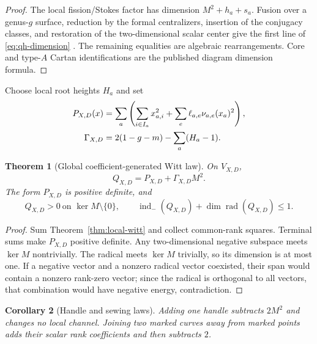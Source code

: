 \documentclass[11pt,a4paper]{amsart}
\theoremstyle{plain}
\newtheorem{theorem}{Theorem}[section]
\newtheorem{corollary}[theorem]{Corollary}
\theoremstyle{definition}
\newcommand{\indm}{\operatorname{ind}_{-}}
\newcommand{\Rad}{\operatorname{rad}}
\begin{document}
\begin{proof}
The local fission/Stokes factor has dimension $M^2+h_a+s_a$.  Fusion over a genus-$g$ surface,
reduction by the formal centralizers, insertion of the conjugacy classes, and restoration of the
two-dimensional scalar center give the first line of \eqref{eq:qh-dimension}
\cite{Boalch2014,BoalchYamakawa2015}.  The remaining equalities are algebraic rearrangements.
Core and type-$A$ Cartan identifications are the published diagram dimension formula.
\end{proof}

Choose local root heights $H_a$ and set
\begin{align}\label{eq:global-positive}
 P_{X,D}(x)&=\sum_a\left(\sum_{i\in I_a}x_{a,i}^2+
                    \sum_e\ell_{a,e}\nu_{a,e}(x_a)^2\right),\\
 \Gamma_{X,D}&=2(1-g-m)-\sum_a(H_a-1).\notag
\end{align}

\begin{theorem}[Global coefficient-generated Witt law]\label{thm:global-witt}
On $V_{X,D}$,
\begin{equation}\label{eq:global-decomposition}
                  \boxed{Q_{X,D}=P_{X,D}+\Gamma_{X,D}M^2.}
\end{equation}
The form $P_{X,D}$ is positive definite, and
\begin{equation}\label{eq:global-inertia}
 Q_{X,D}>0\ \text{on }\ker M\setminus\{0\},\qquad
 \indm(Q_{X,D})+\dim\Rad(Q_{X,D})\leq1.
\end{equation}
\end{theorem}

\begin{proof}
Sum Theorem~\ref{thm:local-witt} and collect common-rank squares.  Terminal sums make
$P_{X,D}$ positive definite.  Any two-dimensional negative subspace meets $\ker M$ nontrivially.
The radical meets $\ker M$ trivially, so its dimension is at most one.  If a negative vector and a
nonzero radical vector coexisted, their span would contain a nonzero rank-zero vector; since the
radical is orthogonal to all vectors, that combination would have negative energy, contradiction.
\end{proof}

\begin{corollary}[Handle and sewing laws]\label{cor:handle}
Adding one handle subtracts $2M^2$ and changes no local channel.  Joining two marked curves away
from marked points adds their scalar rank coefficients and then subtracts $2$.
\end{corollary}
\end{document}
